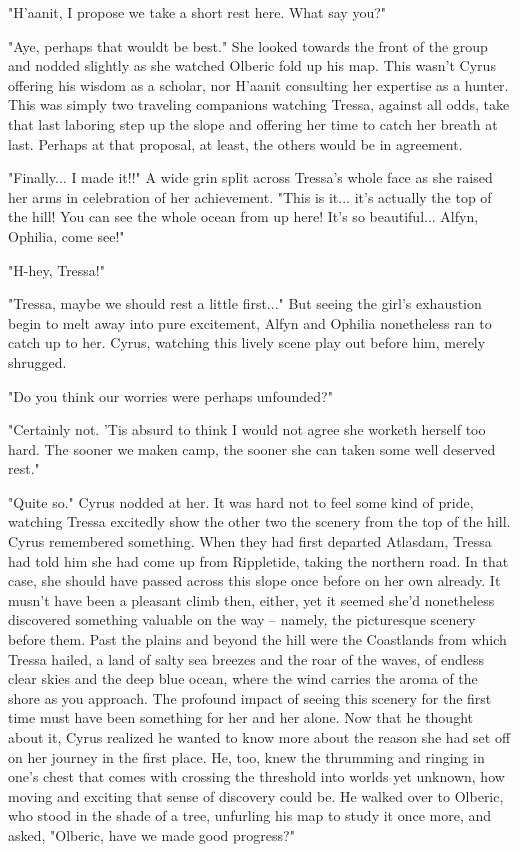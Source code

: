 "H'aanit, I propose we take a short rest here. What say you?"

"Aye, perhaps that wouldt be best." She looked towards the front of the group and nodded slightly as she watched Olberic fold up his map. This wasn't Cyrus offering his wisdom as a scholar, nor H'aanit consulting her expertise as a hunter. This was simply two traveling companions watching Tressa, against all odds, take that last laboring step up the slope and offering her time to catch her breath at last. Perhaps at that proposal, at least, the others would be in agreement.

"Finally... I made it!!" A wide grin split across Tressa's whole face as she raised her arms in celebration of her achievement. "This is it... it's actually the top of the hill! You can see the whole ocean from up here! It's so beautiful... Alfyn, Ophilia, come see!"

"H-hey, Tressa!"

"Tressa, maybe we should rest a little first..." But seeing the girl's exhaustion begin to melt away into pure excitement, Alfyn and Ophilia nonetheless ran to catch up to her. Cyrus, watching this lively scene play out before him, merely shrugged.

"Do you think our worries were perhaps unfounded?"

"Certainly not. 'Tis absurd to think I would not agree she worketh herself too hard. The sooner we maken camp, the sooner she can taken some well deserved rest."

"Quite so." Cyrus nodded at her. It was hard not to feel some kind of pride, watching Tressa excitedly show the other two the scenery from the top of the hill. Cyrus remembered something. When they had first departed Atlasdam, Tressa had told him she had come up from Rippletide, taking the northern road. In that case, she should have passed across this slope once before on her own already. It musn't have been a pleasant climb then, either, yet it seemed she'd nonetheless discovered something valuable on the way -- namely, the picturesque scenery before them. Past the plains and beyond the hill were the Coastlands from which Tressa hailed, a land of salty sea breezes and the roar of the waves, of endless clear skies and the deep blue ocean, where the wind carries the aroma of the shore as you approach. The profound impact of seeing this scenery for the first time must have been something for her and her alone. Now that he thought about it, Cyrus realized he wanted to know more about the reason she had set off on her journey in the first place. He, too, knew the thrumming and ringing in one's chest that comes with crossing the threshold into worlds yet unknown, how moving and exciting that sense of discovery could be. He walked over to Olberic, who stood in the shade of a tree, unfurling his map to study it once more, and asked, "Olberic, have we made good progress?"

